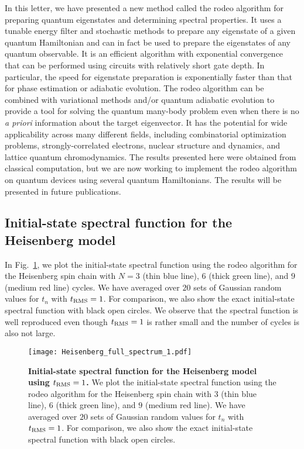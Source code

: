 In this letter, we have presented a new method called the rodeo algorithm for preparing quantum eigenstates and determining spectral properties.  It uses a tunable energy filter and stochastic methods to prepare any eigenstate of a given quantum Hamiltonian and can in fact be used to prepare the eigenstates of any quantum observable.  It is an efficient algorithm with exponential convergence that can be performed using circuits with relatively short gate depth. In particular, the speed for eigenstate preparation is exponentially faster than that for phase estimation or adiabatic evolution. The rodeo algorithm can be combined with variational methods and/or quantum adiabatic evolution to provide a tool for solving the quantum many-body problem even when there is no {\it a priori} information about the target eigenvector.  It has the potential for wide applicability across many different fields, including combinatorial optimization problems, strongly-correlated electrons, nuclear structure and dynamics, and lattice quantum chromodynamics.  The results presented here were obtained from classical computation, but we are now working to implement the rodeo algorithm on quantum devices using several quantum Hamiltonians. The results will be presented in future publications.


\subsection{Initial-state spectral function for the Heisenberg model}

In Fig.~\ref{Heisenberg_spectrum_1}, we plot the initial-state spectral function using the rodeo algorithm for the Heisenberg spin chain with $N=3$ (thin blue line), $6$ (thick green line), and $9$ (medium red line) cycles. We have averaged over $20$ sets of Gaussian random values for $t_n$ with $t_{\rm RMS}=1$.  For comparison, we also show the exact initial-state spectral function with black open circles.  We observe that the spectral function is well reproduced even though $t_{\rm RMS}=1$ is rather small and the number of cycles is also not large.
\begin{figure}[h]
\centering
\texttt{[image: Heisenberg\_full\_spectrum\_1.pdf]}
\caption{{\bf Initial-state spectral function for the Heisenberg model using $t_{\rm RMS}=1$.} We plot the initial-state spectral function using the rodeo algorithm for the Heisenberg spin chain with $3$ (thin blue line), $6$ (thick green line), and $9$ (medium red line). We have averaged over $20$ sets of Gaussian random values for $t_n$ with $t_{\rm RMS}=1$.  For comparison, we also show the exact initial-state spectral function with black open circles.}
\label{Heisenberg_spectrum_1}
\end{figure} 


